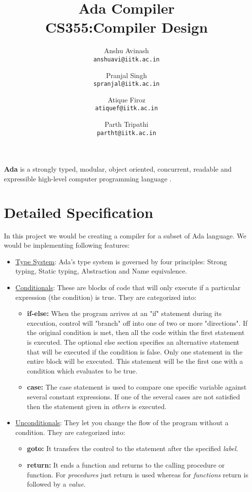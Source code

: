 \documentclass{article}
\title{
Ada Compiler \\
CS355:Compiler Design
}
\author{
Anshu Avinash\\
\texttt{anshuavi@iitk.ac.in}
\and
Pranjal Singh\\
\texttt{spranjal@iitk.ac.in}
\and
Atique Firoz\\
\texttt{atiquef@iitk.ac.in}
\and
Parth Tripathi\\
\texttt{partht@iitk.ac.in}
}
\begin{document}
\maketitle
\textbf{Ada} is a strongly typed, modular, object oriented, concurrent, readable and expressible high-level computer programming language \cite{AdaIC}. 
\section{Detailed Specification}
In this project we would be creating a compiler for a subset of Ada language. We would be implementing following features:

\begin{itemize}
	\item \uline{Type System}: Ada's type system is governed by four principles: Strong typing, Static typing, Abstraction and Name equivalence.
	\item \uline{Conditionals}: These are blocks of code that will only execute if a particular expression (the condition) is true. They are categorized into:
	\begin{itemize}
		\item \textbf{if-else:} When the program arrives at an "if" statement during its execution, control will "branch" off into one of two or more "directions". If the original condition is met, then all the code within the first statement is executed. The optional else section specifies an alternative statement that will be executed if the condition is false. Only one statement in the entire block will be executed. This statement will be the first one with a
condition which evaluates to be true.
		\item \textbf{case:} The case statement is used to compare one specific variable against several constant expressions. If one of the several cases are not satisfied then the statement given in \emph{others} is executed.		
	\end{itemize}	
	
	\item \uline{Unconditionals}: They let you change the flow of the program without a condition. They are categorized into:
		\begin{itemize}
			\item \textbf{goto:} It transfers the control to the statement after the specified \emph{label}.
			\item \textbf{return:} It ends a function and returns to the calling procedure or function. For \emph{procedures} just return is used whereas for \emph{functions} return is followed by a \emph{value}.
		\end{itemize}
		

\end{itemize}
\end{document}
